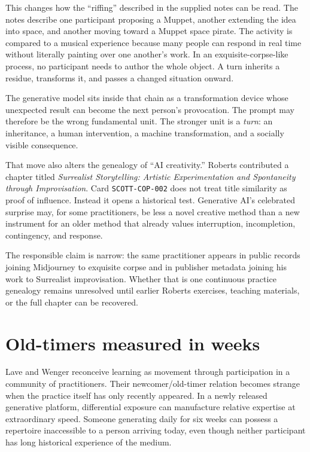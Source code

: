 \documentclass[11pt]{article}
\begin{document}
This changes how the ``riffing'' described in the supplied notes can be read. The notes describe one participant proposing a Muppet, another extending the idea into space, and another moving toward a Muppet space pirate. The activity is compared to a musical experience because many people can respond in real time without literally painting over one another's work. In an exquisite-corpse-like process, no participant needs to author the whole object. A turn inherits a residue, transforms it, and passes a changed situation onward.

The generative model sits inside that chain as a transformation device whose unexpected result can become the next person's provocation. The prompt may therefore be the wrong fundamental unit. The stronger unit is a \emph{turn}: an inheritance, a human intervention, a machine transformation, and a socially visible consequence.

That move also alters the genealogy of ``AI creativity.'' Roberts contributed a chapter titled \emph{Surrealist Storytelling: Artistic Experimentation and Spontaneity through Improvisation}. Card \texttt{SCOTT-COP-002} does not treat title similarity as proof of influence. Instead it opens a historical test. Generative AI's celebrated surprise may, for some practitioners, be less a novel creative method than a new instrument for an older method that already values interruption, incompletion, contingency, and response.

The responsible claim is narrow: the same practitioner appears in public records joining Midjourney to exquisite corpse and in publisher metadata joining his work to Surrealist improvisation. Whether that is one continuous practice genealogy remains unresolved until earlier Roberts exercises, teaching materials, or the full chapter can be recovered.

\section{Old-timers measured in weeks}

Lave and Wenger reconceive learning as movement through participation in a community of practitioners. Their newcomer/old-timer relation becomes strange when the practice itself has only recently appeared. In a newly released generative platform, differential exposure can manufacture relative expertise at extraordinary speed. Someone generating daily for six weeks can possess a repertoire inaccessible to a person arriving today, even though neither participant has long historical experience of the medium.
\end{document}
